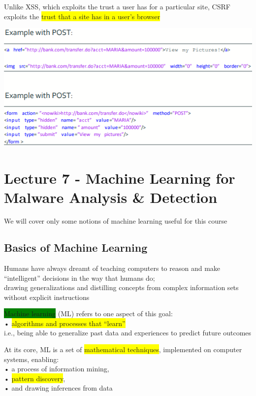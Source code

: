 \documentclass[]{project_plan}
\begin{document}
Unlike XSS, which exploits the trust a user has for a particular site, CSRF exploits the \colorbox{yellow}{trust
  that a site has in a user’s browser}

\includegraphics[width=.9\linewidth]{csrf.png}

\chapter{Lecture 7 - Machine Learning for Malware Analysis \& Detection}

We will cover only some notions of machine learning useful for this course

\section{Basics of Machine Learning}

Humans have always dreamt of teaching computers to reason and make “intelligent” decisions in the way that humans do;\\
drawing generalizations and distilling concepts from complex information sets without explicit instructions

\colorbox{green}{Machine learning} (ML) refers to one aspect of this goal:\\
• \colorbox{yellow}{algorithms and processes that “learn”}\\
i.e., being able to generalize past data and experiences to predict future outcomes

At its core, ML is a set of \colorbox{yellow}{mathematical techniques}, implemented on computer systems, enabling:\\
• a process of information mining,\\
• \colorbox{yellow}{pattern discovery},\\
• and drawing inferences from data
\end{document}

